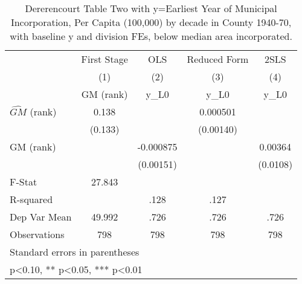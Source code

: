 \begin{table}[htbp]\centering
\def\sym#1{\ifmmode^{#1}\else\(^{#1}\)\fi}
\caption{Dererencourt Table Two with y=Earliest Year of Municipal Incorporation, Per Capita (100,000) by decade in County 1940-70, with baseline y and division FEs, below median area incorporated.}
\begin{tabular}{l*{4}{c}}
\toprule
                    & First Stage   &         OLS   &Reduced Form   &        2SLS   \\
                    &\multicolumn{1}{c}{(1)}&\multicolumn{1}{c}{(2)}&\multicolumn{1}{c}{(3)}&\multicolumn{1}{c}{(4)}\\
                    &\multicolumn{1}{c}{GM  (rank)}&\multicolumn{1}{c}{y\_L0}&\multicolumn{1}{c}{y\_L0}&\multicolumn{1}{c}{y\_L0}\\
\midrule
$\hat{GM}$ (rank)   &       0.138   &               &    0.000501   &               \\
                    &     (0.133)   &               &   (0.00140)   &               \\
\addlinespace
GM  (rank)          &               &   -0.000875   &               &     0.00364   \\
                    &               &   (0.00151)   &               &    (0.0108)   \\
\midrule
F-Stat              &      27.843   &               &               &               \\
R-squared           &               &        .128   &        .127   &               \\
Dep Var Mean        &      49.992   &        .726   &        .726   &        .726   \\
Observations        &         798   &         798   &         798   &         798   \\
\bottomrule
\multicolumn{5}{l}{\footnotesize Standard errors in parentheses}\\
\multicolumn{5}{l}{\footnotesize * p<0.10, ** p<0.05, *** p<0.01}\\
\end{tabular}
\end{table}
